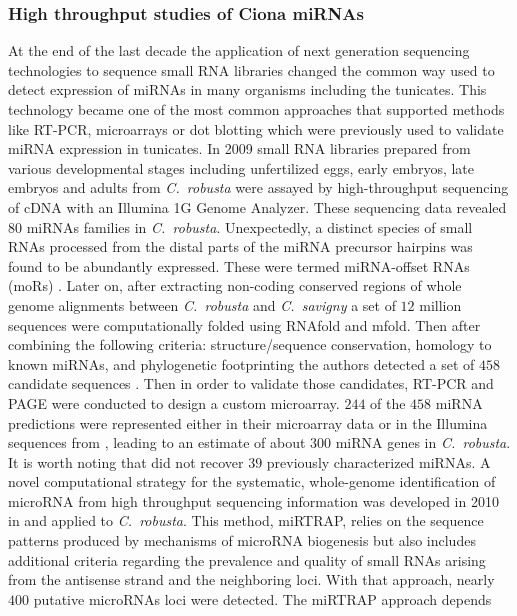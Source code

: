 \documentclass[graybox]{svmult}
\begin{document}
\subsubsection{High throughput studies of Ciona miRNAs} 

At the end of the last decade the application of next generation sequencing
technologies to sequence small RNA libraries changed the common way used to
detect expression of miRNAs in many organisms including the tunicates. This
technology became one of the most common approaches that supported
methods like RT-PCR, microarrays or dot blotting which were previously used
to validate miRNA expression in tunicates. In 2009 small RNA libraries
prepared from various developmental stages including unfertilized eggs,
early embryos, late embryos and adults from \textit{C.\ robusta} were
assayed by high-throughput sequencing of cDNA with an Illumina 1G Genome
Analyzer. These sequencing data revealed $80$ miRNAs families in
\textit{C.\ robusta}.  Unexpectedly, a distinct species of small RNAs
processed from the distal parts of the miRNA precursor hairpins was found
to be abundantly expressed. These were termed miRNA-offset RNAs (moRs)
\citep{Shi2009}.  Later on, after extracting non-coding conserved regions of
whole genome alignments between \textit{C.\ robusta} and \textit{C.\
  savigny} a set of $12$ million sequences were computationally folded
using RNAfold and mfold. Then after combining the following criteria:
structure/sequence conservation, homology to known miRNAs, and phylogenetic
footprinting the authors detected a set of $458$ candidate sequences
\citep{Keshavan2010}. Then in order to validate those candidates, RT-PCR and
PAGE were conducted to design a custom microarray.  $244$ of the $458$
miRNA predictions were represented either in their microarray data or in
the Illumina sequences from \citep{Shi2009}, leading to an estimate of about
$300$ miRNA genes in \textit{C.\ robusta}. It is worth noting that
\citep{Keshavan2010} did not recover $39$ previously characterized miRNAs.
A novel computational strategy for the systematic, whole-genome
identification of microRNA from high throughput sequencing information was
developed in 2010 in \citet{Hendrix2010} and applied to \textit{C.\
  robusta}. This method, miRTRAP, relies on the sequence patterns produced
by mechanisms of microRNA biogenesis but also includes additional criteria
regarding the prevalence and quality of small RNAs arising from the
antisense strand and the neighboring loci. With that approach, nearly $400$
putative microRNAs loci were detected. The miRTRAP approach depends
\end{document}
